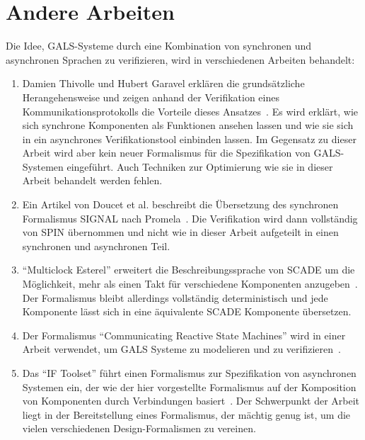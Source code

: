 \section{Andere Arbeiten}
Die Idee, GALS-Systeme durch eine Kombination von synchronen und asynchronen Sprachen zu verifizieren, wird in verschiedenen Arbeiten behandelt:
\begin{enumerate}
\item Damien Thivolle und Hubert Garavel erklären die grundsätzliche Herangehensweise und zeigen anhand der Verifikation eines Kommunikationsprotokolls die Vorteile dieses Ansatzes~\cite{gals_sam}.
Es wird erklärt, wie sich synchrone Komponenten als Funktionen ansehen lassen und wie sie sich in ein asynchrones Verifikationstool einbinden lassen.
Im Gegensatz zu dieser Arbeit wird aber kein neuer Formalismus für die Spezifikation von GALS-Systemen eingeführt.
Auch Techniken zur Optimierung wie sie in dieser Arbeit behandelt werden fehlen.
\item Ein Artikel von Doucet et al. beschreibt die Übersetzung des synchronen Formalismus SIGNAL nach Promela~\cite{gals_signal}.
  Die Verifikation wird dann vollständig von SPIN übernommen und nicht wie in dieser Arbeit aufgeteilt in einen synchronen und asynchronen Teil.
\item "`Multiclock Esterel"' erweitert die Beschreibungssprache von SCADE um die Möglichkeit, mehr als einen Takt für verschiedene Komponenten anzugeben~\cite{multiclock_esterel}.
  Der Formalismus bleibt allerdings vollständig deterministisch und jede Komponente lässt sich in eine äquivalente SCADE Komponente übersetzen.
\item Der Formalismus "`Communicating Reactive State Machines"' wird in einer Arbeit verwendet, um GALS Systeme zu modelieren und zu verifizieren~\cite{gals_crsm}.
\item Das "`IF Toolset"' führt einen Formalismus zur Spezifikation von asynchronen Systemen ein, der wie der hier vorgestellte Formalismus auf der Komposition von Komponenten durch Verbindungen basiert~\cite{if_toolset}.
  Der Schwerpunkt der Arbeit liegt in der Bereitstellung eines Formalismus, der mächtig genug ist, um die vielen verschiedenen Design-Formalismen zu vereinen.
\end{enumerate}
